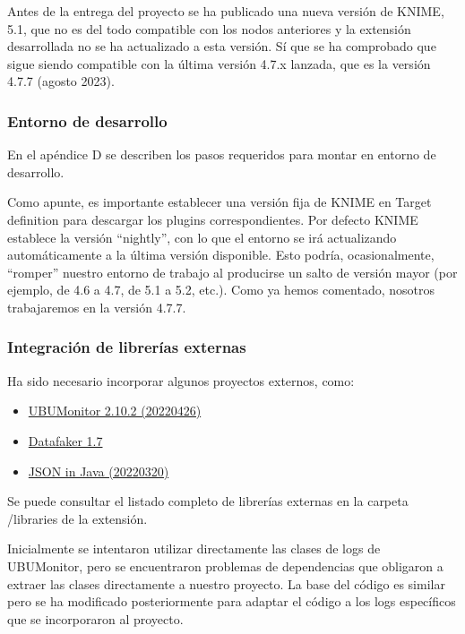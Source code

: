 Antes de la entrega del proyecto se ha publicado una nueva versión de KNIME, 5.1, que no es del todo compatible 
con los nodos anteriores y la extensión desarrollada no se ha actualizado a esta versión. Sí que se ha comprobado que 
sigue siendo compatible con la última versión 4.7.x lanzada, que es la versión 4.7.7 (agosto 2023).

\subsubsection{Entorno de desarrollo}

En el apéndice D se describen los pasos requeridos para montar en entorno de desarrollo. 

Como apunte, es importante establecer una versión fija de KNIME en Target definition para descargar los plugins 
correspondientes. Por defecto KNIME establece la versión ``nightly'', con lo que el entorno se irá actualizando automáticamente a la última versión disponible. 
Esto podría, ocasionalmente, ``romper'' nuestro entorno de trabajo al producirse un salto de versión mayor (por ejemplo, de 4.6 a 4.7, de 5.1 a 5.2, etc.). 
Como ya hemos comentado, nosotros trabajaremos en la versión 4.7.7.


\subsubsection{Integración de librerías externas}

Ha sido necesario incorporar algunos proyectos externos, como:

\begin{itemize}
	\item \href{https://github.com/yjx0003/UBUMonitor/releases}{UBUMonitor 2.10.2 (20220426)}
	\item \href{https://www.datafaker.net/releases/1.7.0/}{Datafaker 1.7}
	\item \href{https://github.com/stleary/JSON-java}{JSON in Java (20220320)}
\end{itemize}

Se puede consultar el listado completo de librerías externas en la carpeta /libraries de la extensión. 
\

Inicialmente se intentaron utilizar directamente las clases de logs de UBUMonitor, pero se 
encuentraron problemas de dependencias que obligaron a extraer las clases directamente a nuestro proyecto. 
La base del código es similar pero se ha modificado posteriormente para adaptar el código a los logs específicos que se incorporaron al proyecto. 

